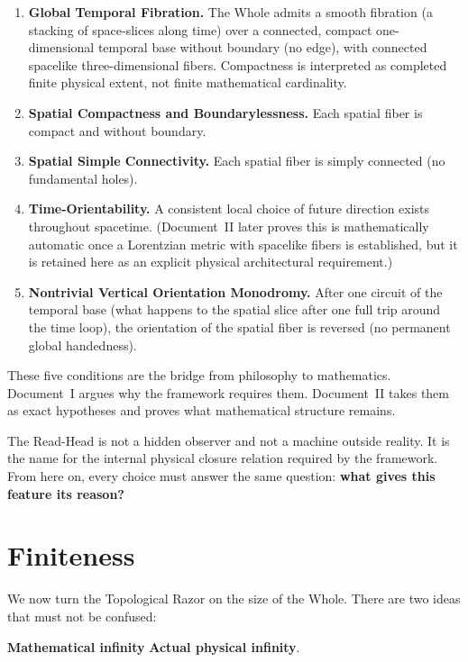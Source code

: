 \documentclass[11pt]{article}
\theoremstyle{canonstyle}
\begin{document}
\begin{enumerate}
    \item \textbf{Global Temporal Fibration.} The Whole admits a smooth fibration (a stacking of space-slices along time) over a connected, compact one-dimensional temporal base without boundary (no edge), with connected spacelike three-dimensional fibers. Compactness is interpreted as completed finite physical extent, not finite mathematical cardinality.
    \item \textbf{Spatial Compactness and Boundarylessness.} Each spatial fiber is compact and without boundary.
    \item \textbf{Spatial Simple Connectivity.} Each spatial fiber is simply connected (no fundamental holes).
    \item \textbf{Time-Orientability.} A consistent local choice of future direction exists throughout spacetime. (Document~II later proves this is mathematically automatic once a Lorentzian metric with spacelike fibers is established, but it is retained here as an explicit physical architectural requirement.)
    \item \textbf{Nontrivial Vertical Orientation Monodromy.} After one circuit of the temporal base (what happens to the spatial slice after one full trip around the time loop), the orientation of the spatial fiber is reversed (no permanent global handedness).
\end{enumerate}

These five conditions are the bridge from philosophy to mathematics. Document~I argues why the framework requires them. Document~II takes them as exact hypotheses and proves what mathematical structure remains.

\begin{plainwords}
The Read-Head is not a hidden observer and not a machine outside reality. It is the name for the internal physical closure relation required by the framework. From here on, every choice must answer the same question: \textbf{what gives this feature its reason?}
\end{plainwords}

\newpage
\section{Finiteness}

We now turn the Topological Razor on the size of the Whole. There are two ideas that must not be confused:
\begin{center}
\textbf{Mathematical infinity} \qquad{}\qquad \textbf{Actual physical infinity}.
\end{center}
\end{document}
